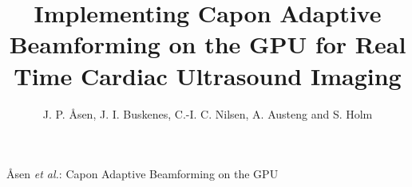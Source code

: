 \documentclass[journal]{IEEEtran}
\begin{document}
%
\title{Implementing Capon Adaptive Beamforming on the GPU for Real Time Cardiac Ultrasound Imaging}
%
%
%

\author{J. P. \AA{}sen, J. I. Buskenes, C.-I. C. Nilsen, A. Austeng and S. Holm%
}

% 
%



%
{\AA{}sen \MakeLowercase{\textit{et al.}}: Capon Adaptive Beamforming on the GPU}
% 
\end{document}
